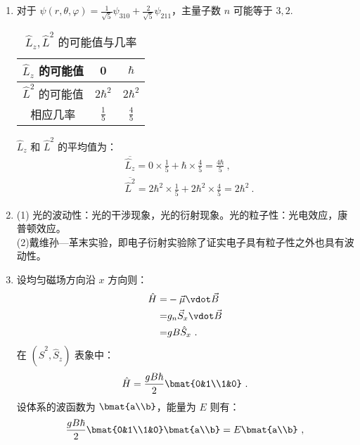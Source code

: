 
\begin{issues}
\issueTODO
\issueDraft
\end{issues}

\subsection{ }
\begin{enumerate}
\item 对于 $\psi(r,\theta,\varphi) = \frac{1}{\sqrt{5}}\psi_{310} + \frac{2}{\sqrt{5}}\psi_{211} $，主量子数 $n$ 可能等于 $3,2$.\\
\begin{table}[ht]
\centering
\caption{$\hat{L}_{z},\hat{L}^{2}$ 的可能值与几率}\label{tab_TJU14A_1}
\begin{tabular}{|c|c|c|}
\hline
$\hat{L}_z$ 的可能值 & 0 & $\hbar$  \\
\hline
$\hat{L}^2$ 的可能值 & $2\hbar^{2}$ & $2\hbar^{2}$  \\
\hline
相应几率 & $\frac{1}{5}$ & $\frac{4}{5}$  \\
\hline
\end{tabular}
\end{table}
$\hat{L}_{z}$ 和 $\hat{L}^{2}$ 的平均值为：\\
\begin{align}\label{eq_TJU14A_1}
& \overline{\hat{L}_{z}} = 0 \times \frac{1}{5} + \hbar \times \frac{4}{5} = \frac{4\hbar}{5} ~,\\
& \overline{\hat{L}^{2}} = 2\hbar^{2} \times \frac{1}{5} + 2\hbar^{2} \times \frac{4}{5} = 2\hbar^{2}~.
\end{align}
\item (1) 光的波动性：光的干涉现象，光的衍射现象。光的粒子性：光电效应，康普顿效应。\\
(2)戴维孙—革末实验，即电子衍射实验除了证实电子具有粒子性之外也具有波动性。
\item 设均匀磁场方向沿 $x$ 方向则：
\begin{equation}
\begin{aligned}
\hat{H}=& -\vec{\mu}\vdot \vec{B} \\
=& g_{n}\vec{S}_{x}\vdot \vec{B} \\
=& gB\hat{S}_{x}~.
\end{aligned}
\end{equation}
在 $(\hat{S}^{2},\hat{S}_{z})$ 表象中：
\begin{equation}
\hat{H}=\frac{gB\hbar}{2}\bmat{0&1\\1&0}~.
\end{equation}
设体系的波函数为 $\bmat{a\\b}$，能量为 $E$ 则有：
\begin{equation}
\frac{gB\hbar}{2}\bmat{0&1\\1&0}\bmat{a\\b}=E\bmat{a\\b}~,
\end{equation}


\end{enumerate}
